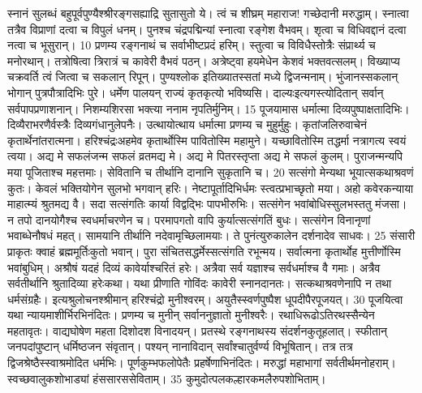 स्नानं सुलब्धं बहुपूर्वपुण्यैश्श्रीरङ्गसह्याद्रि सुतासुतो ये।
 त्वं च शीघ्रम् महाराज! गच्छेदानी मरुद्धाम्।
 स्नात्वा तत्रैव विप्राणां दत्वा च विपुलं धनम्।
 पुनश्च चंद्रपद्मिन्यां स्नात्वा रङ्गेश वैभवम्।
 शृत्वा च विधिवद्दानं दत्वा नत्वा च भूसुरान्।
 10 प्रणम्य रङ्गनाथं च सर्वाभीष्टप्रदं हरिम्।
 स्तुत्वा च विविधैस्तोत्रैः संप्रार्थ्य च मनोरथान्।
 तत्रोषित्वा त्रिरात्रं च कावेरी वैभवं पठन्।
 अत्रेष्ट्वा हयमेधेन केशवं भक्तवत्सलम्।
 विख्याप्य चक्रवर्ति त्वं जित्वा च सकलान् रिपून्।
 पुण्यश्लोक इतिख्यातस्सतां मध्ये द्विजन्मनाम्।
 भुंजानस्सकलान् भोगान् पुत्रपौत्रादिभिः पुरे।
 धर्मेण पालयन् राज्यं कृतकृत्यो भविष्यसि।
 दाल्यःइत्यगस्त्योदितान् सर्वान् सर्वपापप्रणाशनान्।
 निशम्यशिरसा भक्त्या ननाम नृपतिर्मुनिम्।
 15
पूजयामास धर्मात्मा दिव्यपुष्पाक्षतादिभिः।
 दिव्यैराभरणैर्वस्त्रैः दिव्यगंधानुलेपनैः।
 उत्थायोत्थाय धर्मात्मा प्रणम्य च मुहुर्मुहुः।
 कृतांजलिरुवाचेनं कृतार्थेनांतरात्मना।
 हरिश्चंद्रःअहमेव कृतार्थोस्मि पावितोस्मि महामुने।
 यच्छावितोस्मि तद्धर्मा नत्रागत्य स्वयं त्वया।
 अद्य मे सफलंजन्म सफलं व्रतमद्य मे।
 अद्य मे पितरस्तृप्ता अद्य मे सफलं कुलम्।
 पुराजन्मन्यपि मया पूजिताश्च महत्तमाः।
 सेवितानि च तीर्थानि दानानि सुकृतानि च।
 20 सत्संगो मेन्यथा भूयात्सकथाश्रवणं कुतः।
 केवलं भक्तियोगेन सुलभो भगवान् हरिः।
 नेष्टापूर्तादिभिर्धमः स्त्वत्प्रभाच्छृतो मया।
 अहो कवेरकन्याया माहात्म्यं श्रुतमद्य वै।
 सदा सत्संगतिः कार्या विद्वद्भिः पापभीरुभिः।
 सत्संगेन भवांबोधिस्सुलभस्ततु मंजसा।
 न तपो दानयोगैश्च स्वधर्माचरणेन च।
 परमापगतो वापि कुर्यात्सत्संगतिं बुधः।
 सत्संगेन विनानृणां भवाब्धेनौषधं महत्।
 सामयानि तीर्थानि नदेवामृच्छिलामयाः।
 ते पुनंत्युरुकालेन दर्शनादेव साधवः।
 25
संसारी प्राकृतः क्वाहं ब्रह्ममूर्तिःकुतो भवान्।
 पुरा संचितसद्धर्मेस्सत्संगति रभून्मय।
 सर्वात्मना कृतार्थोह मुत्तीर्णोस्मि भवांबुधिम्।
 अश्रौषं यदहं दिव्यं कावेर्याश्चरितं हरेः।
 अत्रैवा सर्व यज्ञाश्च सर्वधर्माश्च वै गमाः।
 अत्रैव सर्वतीर्थानि श्रुतादिव्या हरेःकथा।
 यथा प्रीणाति गोविंदः कावेरी स्नानदानतः।
 सत्कथाश्रवणेनापि न तथा धर्मसंग्रहैः।
 इत्यश्रुलोचनश्श्रीमान् हरिश्चंद्रो मुनीश्वरम्।
 अयुतैस्स्वर्णपुष्पैश धूपदीपैरपूजयत्।
 30 पूजयित्वा यथा न्यायमाशीर्भिरभिनंदितः।
 प्रणम्य च मुनीन् सर्वाननुज्ञातो मुनीश्वरैः।
 रथाधिरूढोऽतिरथस्सैन्येन महतावृतः।
 वाद्यघोषेण महता दिशोदश विनादयन्।
 प्रतस्थे रङ्गनाथस्य संदर्शनकुतूहलात्।
 स्फीतान् जनपदांपुष्टान् धर्मिष्ठजन संवृतान्।
 पश्यन् नानाविदान् सर्वांश्चातुर्वर्ण्य विभूषितान्।
 तत्र तत्र द्विजश्रेष्ठैस्स्वाश्रमोदित धर्मभिः।
 पूर्णकुम्भफलोपेतैः प्रहर्षेणाभिनंदितः।
 मरुद्धां महाभागां सर्वतीर्थमनोहराम्।
 स्वच्छवालुकशोभाड्यां हंससारससेविताम्।
 35 कुमुदोत्पलकल्हारकमलैरुपशोभिताम्।

